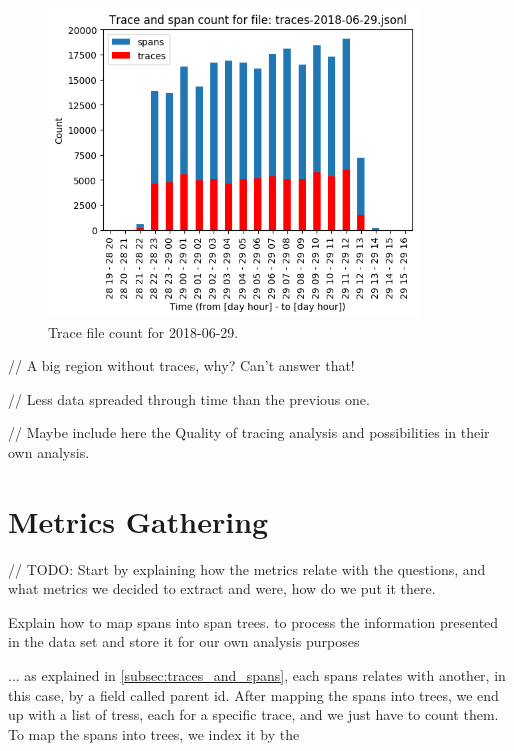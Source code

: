 \begin{figure}[H]
    \centering
    \includegraphics[width=0.88\textwidth]{images/trace_file_count_2018_06_29_chart.png}
    \caption{Trace file count for 2018-06-29.}
    \label{fig:trace_file_count_2018_06_29}
\end{figure}

// A big region without traces, why? Can't answer that!

// Less data spreaded through time than the previous one.

// Maybe include here the Quality of tracing analysis and possibilities in their own analysis.



\section{Metrics Gathering}
\label{sec:metrics_gathering}

// TODO: Start by explaining how the metrics relate with the questions, and what metrics we decided to extract and were, how do we put it there.

Explain how to map spans into span trees.
to process the information presented in the data set and store it for our own analysis purposes

... as explained in \ref{subsec:traces_and_spans}, each spans relates with another, in this case, by a field called parent id. After mapping the spans into trees, we end up with a list of tress, each for a specific trace, and we just have to count them. To map the spans into trees, we index it by the 

